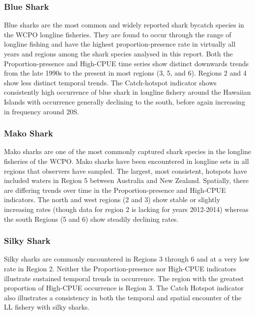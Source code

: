 \documentclass[12pt]{SCreport}
\begin{document}
        \subsubsection{Blue Shark}
Blue sharks are the most common and widely reported shark bycatch species in the WCPO longline fisheries.  They are found to occur through the range of longline fishing and have the highest proportion-presence rate in virtually all years and regions among the shark species analysed in this report.  Both the Proportion-presence and High-CPUE time series show distinct downwards trends from the late 1990s to the present in most regions (3, 5, and 6).  Regions 2 and 4 show less distinct temporal trends.  The Catch-hotspot indicator shows consistently high occurrence of blue shark in longline fishery around the Hawaiian Islands with occurrence generally declining to the south, before again increasing in frequency around 20\degree{}S.


\subsubsection{Mako Shark}
Mako sharks are one of the most commonly captured shark species in the longline fisheries of the WCPO.  Mako sharks have been encountered in longline sets in all regions that observers have sampled.  The largest, most consistent, hotspots have included waters in Region 5 between Australia and New Zealand.  Spatially, there are differing trends over time in the Proportion-presence and High-CPUE indicators.  The north and west regions (2 and 3) show stable or slightly increasing rates (though data for region 2 is lacking for years 2012-2014) whereas the south Regions (5 and 6) show steadily declining rates.

         
 \subsubsection{Silky Shark}
 Silky sharks are commonly encountered in Regions 3 through 6 and at a very low rate in Region 2.  Neither the Proportion-presence nor High-CPUE indicators illustrate sustained temporal trends in occurrence.  The region with the greatest proportion of High-CPUE occurrence is Region 3.  The Catch Hotspot indicator also illustrates a consistency in both the temporal and spatial encounter of the LL fishery with silky sharks.
\end{document}
